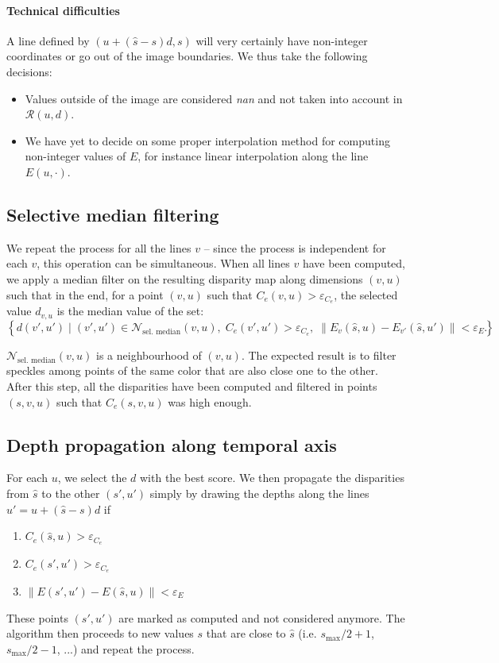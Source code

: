 \documentclass{article}
\newcommand{\norm}[1]{\left\lVert#1\right\rVert}
\theoremstyle{definition}
\begin{document}
\paragraph{Technical difficulties} A line defined by $(u + (\widehat{s} - s) d, s)$ will very certainly have non-integer coordinates or go out of the image boundaries. We thus take the following decisions:
\begin{itemize}
 \item Values outside of the image are considered \emph{nan} and not taken into account in $\mathcal{R}(u, d)$.
 \item We have yet to decide on some proper interpolation method for computing non-integer values of $E$, for instance linear interpolation along the line $E(u, \cdot)$.
\end{itemize}


\subsection{Selective median filtering}


We repeat the process for all the lines $v$ -- since the process is independent for each $v$, this operation can be simultaneous. When all lines $v$ have been computed, we apply a median filter on the resulting disparity map along dimensions $(v, u)$ such that in the end, for a point $(v, u)$ such that $C_e (v, u) > \varepsilon_{C_e}$, the selected value $d_{v, u}$ is the median value of the set:
\[ \left\{ d (v', u') \; | \; (v', u') \in \mathcal{N}_\text{sel. median}(v, u), \; C_e(v', u') > \varepsilon_{C_e}, \; \norm{E_{v}(\widehat{s}, u) - E_{v'}(\widehat{s}, u')} < \varepsilon_{E} \right\}.\]

$\mathcal{N}_\text{sel. median}(v, u)$ is a neighbourhood of $(v, u)$. The expected result is to filter speckles among points of the same color that are also close one to the other. After this step, all the disparities have been computed and filtered in points $(s, v, u)$ such that $C_e(s, v, u)$ was high enough.



\subsection{Depth propagation along temporal axis}


For each $u$, we select the $d$ with the best score. We then propagate the disparities from $\widehat{s}$ to the other $(s', u')$ simply by drawing the depths along the lines $u' = u + (\widehat{s} - s)d$ if 
\begin{enumerate}
 \item $C_e(\widehat{s}, u) > \varepsilon_{C_e}$
 \item $C_e(s', u') > \varepsilon_{C_e}$
 \item $\norm{E(s', u') - E(\widehat{s}, u)} < \varepsilon_E$
\end{enumerate}
These points $(s', u')$ are marked as computed and not considered anymore. The algorithm then proceeds to new values $s$ that are close to $\widehat{s}$ (i.e. $s_{\max} / 2 + 1$, $s_{\max} / 2 - 1$, ...) and repeat the process.
\end{document}
